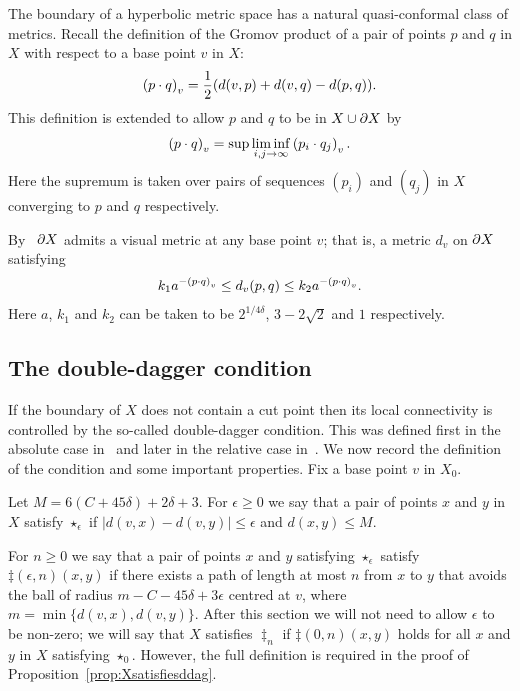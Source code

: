 The boundary of a hyperbolic metric space has a natural quasi-conformal class
of metrics.  Recall the definition of the Gromov product of a pair of points
$p$ and $q$ in $X$ with respect to a base point $v$ in $X$:
\begin{align*}
\gromprod[v]{p}{q} = \frac{1}{2}(d(v, p) + d(v, q) - d(p, q)).
\end{align*}
This definition is extended to allow $p$ and $q$ to be in $X \union \boundary X$ by
\begin{align*}
\gromprod[v]{p}{q} = \sup\liminf_{i, j \to \infty}\gromprod[v]{p_i}{q_j}.
\end{align*}
Here the supremum is taken over pairs of sequences $(p_i)$ and $(q_j)$ in $X$
converging to $p$ and $q$ respectively.

By~\cite[III.H.3.21]{bridsonhaefliger99} $\boundary X$ admits a visual metric
at any base point $v$; that is, a metric $d_v$ on $\boundary X$ satisfying
\begin{align*}
k_1 a^{-\gromprod[v]{p}{q}} \leq d_v(p, q) \leq k_2 a^{-\gromprod[v]{p}{q}}.
\end{align*}
Here $a$, $k_1$ and $k_2$ can be taken to be $2^{1/4\delta}$, $3-2\sqrt{2}$ and
$1$ respectively.

\subsection{The double-dagger condition}

If the boundary of $X$ does not contain a cut point then its local
connectivity is controlled by the so-called double-dagger condition. This was
defined first in the absolute case in~\cite{bestvinamess91} and later in the
relative case in~\cite{dahmanigroves08a}. We now record the definition of the
condition and some important properties. Fix a base point $v$ in $X_0$.

Let $M = 6(C + 45\delta) + 2\delta + 3$. For $\epsilon \geq 0$ we say that a
pair of points $x$ and $y$ in $X$ satisfy $\star_\epsilon$ if $\vert d(v, x) -
d(v, y)\vert \leq \epsilon$ and $d(x, y) \leq M$. 

For $n \geq 0$ we say that a pair of points $x$ and $y$ satisfying
$\star_\epsilon$ satisfy $\ddag(\epsilon, n)(x, y)$ if there exists a path of
length at most $n$ from $x$ to $y$ that avoids the ball of radius $m - C -
45\delta + 3\epsilon$ centred at $v$, where $m = \min\{d(v, x), d(v, y)\}$.
After this section we will not need to allow $\epsilon$ to be non-zero; we
will say that $X$ satisfies $\ddag_n$ if $\ddag(0, n)(x, y)$ holds for all $x$
and $y$ in $X$ satisfying $\star_0$. However, the full definition is required
in the proof of Proposition~\ref{prop:Xsatisfiesddag}.

